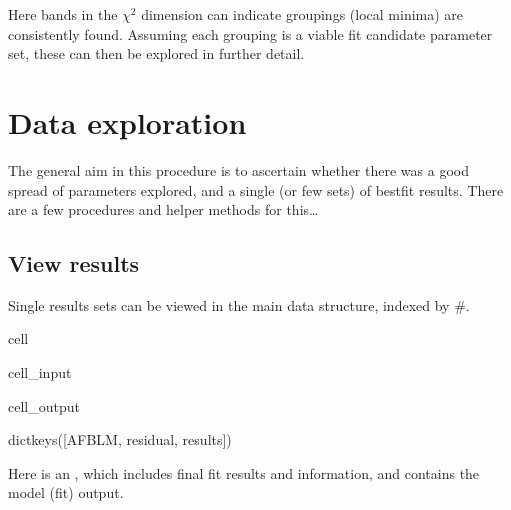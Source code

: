 \documentclass[letterpaper,table,10pt,english]{jupyterBook}
\begin{document}
\sphinxAtStartPar
Here bands in the \(\chi^2\) dimension can indicate groupings (local minima) are consistently found. Assuming each grouping is a viable fit candidate parameter set, these can then be explored in further detail.


\section{Data exploration}
\label{\detokenize{part2/case-study-C2H4_290723:data-exploration}}
\sphinxAtStartPar
The general aim in this procedure is to ascertain whether there was a good spread of parameters explored, and a single (or few sets) of best\sphinxhyphen{}fit results. There are a few procedures and helper methods for this…


\subsection{View results}
\label{\detokenize{part2/case-study-C2H4_290723:view-results}}
\sphinxAtStartPar
Single results sets can be viewed in the main data structure, indexed by \#.

\begin{sphinxuseclass}{cell}\begin{sphinxVerbatimInput}

\begin{sphinxuseclass}{cell_input}
\begin{sphinxVerbatim}[commandchars=\\\{\}]
  
\PYG{p}{[}\PYG{p}{]}
\end{sphinxVerbatim}

\end{sphinxuseclass}\end{sphinxVerbatimInput}
\begin{sphinxVerbatimOutput}

\begin{sphinxuseclass}{cell_output}
\begin{sphinxVerbatim}[commandchars=\\\{\}]
dict\PYGZus{}keys([\PYGZsq{}AFBLM\PYGZsq{}, \PYGZsq{}residual\PYGZsq{}, \PYGZsq{}results\PYGZsq{}])
\end{sphinxVerbatim}

\end{sphinxuseclass}\end{sphinxVerbatimOutput}

\end{sphinxuseclass}
\sphinxAtStartPar
Here  is an , which includes final fit results and information, and  contains the model (fit) output.
\end{document}
